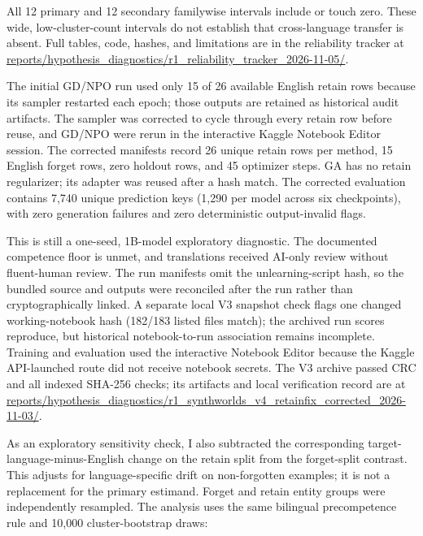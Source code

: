 \documentclass[10pt,a4paper]{article}
\begin{document}
All 12 primary and 12 secondary familywise intervals include or touch zero. These wide, low-cluster-count intervals do not establish that cross-language transfer is absent. Full tables, code, hashes, and limitations are in the reliability tracker at \url{reports/hypothesis_diagnostics/r1_reliability_tracker_2026-11-05/}.

The initial GD/NPO run used only 15 of 26 available English retain rows because its sampler restarted each epoch; those outputs are retained as historical audit artifacts. The sampler was corrected to cycle through every retain row before reuse, and GD/NPO were rerun in the interactive Kaggle Notebook Editor session. The corrected manifests record 26 unique retain rows per method, 15 English forget rows, zero holdout rows, and 45 optimizer steps. GA has no retain regularizer; its adapter was reused after a hash match. The corrected evaluation contains 7,740 unique prediction keys (1,290 per model across six checkpoints), with zero generation failures and zero deterministic output-invalid flags.

This is still a one-seed, 1B-model exploratory diagnostic. The documented competence floor is unmet, and translations received AI-only review without fluent-human review. The run manifests omit the unlearning-script hash, so the bundled source and outputs were reconciled after the run rather than cryptographically linked. A separate local V3 snapshot check flags one changed working-notebook hash (182/183 listed files match); the archived run scores reproduce, but historical notebook-to-run association remains incomplete. Training and evaluation used the interactive Notebook Editor because the Kaggle API-launched route did not receive notebook secrets. The V3 archive passed CRC and all indexed SHA-256 checks; its artifacts and local verification record are at \url{reports/hypothesis_diagnostics/r1_synthworlds_v4_retainfix_corrected_2026-11-03/}.

As an exploratory sensitivity check, I also subtracted the corresponding target-language-minus-English change on the retain split from the forget-split contrast. This adjusts for language-specific drift on non-forgotten examples; it is not a replacement for the primary estimand. Forget and retain entity groups were independently resampled. The analysis uses the same bilingual precompetence rule and 10,000 cluster-bootstrap draws:
\end{document}
